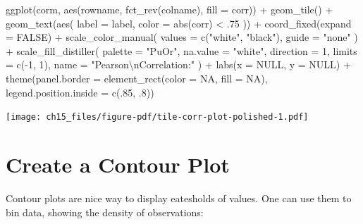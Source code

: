 \documentclass[
  letterpaper,
]{scrbook}
\newenvironment{Shaded}{\begin{snugshade}}{\end{snugshade}}
\newcommand{\AttributeTok}[1]{\textcolor[rgb]{0.40,0.45,0.13}{#1}}
\newcommand{\ConstantTok}[1]{\textcolor[rgb]{0.56,0.35,0.01}{#1}}
\newcommand{\DecValTok}[1]{\textcolor[rgb]{0.68,0.00,0.00}{#1}}
\newcommand{\FunctionTok}[1]{\textcolor[rgb]{0.28,0.35,0.67}{#1}}
\newcommand{\NormalTok}[1]{\textcolor[rgb]{0.00,0.23,0.31}{#1}}
\newcommand{\SpecialCharTok}[1]{\textcolor[rgb]{0.37,0.37,0.37}{#1}}
\newcommand{\StringTok}[1]{\textcolor[rgb]{0.13,0.47,0.30}{#1}}
\begin{document}
\begin{Shaded}
\begin{Highlighting}[]
\FunctionTok{ggplot}\NormalTok{(corm, }\FunctionTok{aes}\NormalTok{(rowname, }\FunctionTok{fct\_rev}\NormalTok{(colname),}
                 \AttributeTok{fill =}\NormalTok{ corr)) }\SpecialCharTok{+}
  \FunctionTok{geom\_tile}\NormalTok{() }\SpecialCharTok{+}
  \FunctionTok{geom\_text}\NormalTok{(}\FunctionTok{aes}\NormalTok{(}
    \AttributeTok{label =}\NormalTok{ label,}
    \AttributeTok{color =} \FunctionTok{abs}\NormalTok{(corr) }\SpecialCharTok{\textless{}}\NormalTok{ .}\DecValTok{75}
\NormalTok{  )) }\SpecialCharTok{+}
  \FunctionTok{coord\_fixed}\NormalTok{(}\AttributeTok{expand =} \ConstantTok{FALSE}\NormalTok{) }\SpecialCharTok{+}
  \FunctionTok{scale\_color\_manual}\NormalTok{(}
    \AttributeTok{values =} \FunctionTok{c}\NormalTok{(}\StringTok{"white"}\NormalTok{, }\StringTok{"black"}\NormalTok{),}
    \AttributeTok{guide =} \StringTok{"none"}
\NormalTok{  ) }\SpecialCharTok{+}
  \FunctionTok{scale\_fill\_distiller}\NormalTok{(}
    \AttributeTok{palette =} \StringTok{"PuOr"}\NormalTok{, }\AttributeTok{na.value =} \StringTok{"white"}\NormalTok{,}
    \AttributeTok{direction =} \DecValTok{1}\NormalTok{, }\AttributeTok{limits =} \FunctionTok{c}\NormalTok{(}\SpecialCharTok{{-}}\DecValTok{1}\NormalTok{, }\DecValTok{1}\NormalTok{),}
    \AttributeTok{name =} \StringTok{"Pearson}\SpecialCharTok{\textbackslash{}n}\StringTok{Correlation:"}
\NormalTok{  ) }\SpecialCharTok{+}
  \FunctionTok{labs}\NormalTok{(}\AttributeTok{x =} \ConstantTok{NULL}\NormalTok{, }\AttributeTok{y =} \ConstantTok{NULL}\NormalTok{) }\SpecialCharTok{+}
  \FunctionTok{theme}\NormalTok{(}\AttributeTok{panel.border =} \FunctionTok{element\_rect}\NormalTok{(}\AttributeTok{color =} \ConstantTok{NA}\NormalTok{, }\AttributeTok{fill =} \ConstantTok{NA}\NormalTok{),}
        \AttributeTok{legend.position.inside =} \FunctionTok{c}\NormalTok{(.}\DecValTok{85}\NormalTok{, .}\DecValTok{8}\NormalTok{))}
\end{Highlighting}
\end{Shaded}

\texttt{[image: ch15\_files/figure-pdf/tile-corr-plot-polished-1.pdf]}

\section{Create a Contour Plot}\label{create-a-contour-plot}

Contour plots are nice way to display eatesholds of values. One can use
them to bin data, showing the density of observations:
\end{document}
